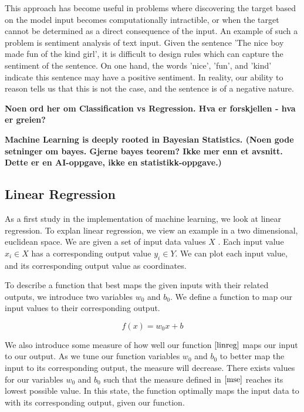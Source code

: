 This approach has become useful in problems where discovering the target based on the model input becomes computationally intractible,
or when the target cannot be determined as a direct consequence of the input. 
An example of such a problem is sentiment analysis of text input. 
Given the sentence 'The nice boy made fun of the kind girl', 
it is difficult to design rules which can capture the sentiment of the sentence.
On one hand, the words 'nice', 'fun', and 'kind' indicate this sentence may have a positive sentiment.
In reality, our ability to reason tells us that this is not the case, and the sentence is of a negative nature.

\textbf{Noen ord her om Classification vs Regression. Hva er forskjellen - hva er greien?}


\textbf{Machine Learning is deeply rooted in Bayesian Statistics. (Noen gode setninger om bayes. Gjerne bayes teorem? Ikke mer enn et avsnitt. Dette er en AI-oppgave, ikke en statistikk-oppgave.)}


\subsection{Linear Regression}
\label{subsection:linreg}

As a first study in the implementation of machine learning, we look at linear regression.
To explan linear regression, we view an example in a two dimensional, euclidean space.
We are given a set of input data values $ X $ . Each input value $ x_i \in X $ has a corresponding output value $ y_i \in Y $.
We can plot each input value, and its corresponding output value as coordinates.


To describe a function that best maps the given inputs with their related outputs, 
we introduce two variables $ w_0 $ and $ b_0 $. We define a function to map our input values to their corresponding output.

\[
        f(x) = w_0x + b \tag{2.1} \label{linreg}
\]

We also introduce some measure of how well our function $ \eqref{linreg} $
maps our input to our output. As we tune our function variables $ w_0 $ and $ b_0 $ to better map the input to its corresponding output,
the measure will decrease. There exists values for our variables $ w_0 $ and $ b_0 $  such that the measure defined in $ \eqref{mse} $ reaches its lowest possible value.
In this state, the function optimally maps the input data to with its corresponding output, given our function.

